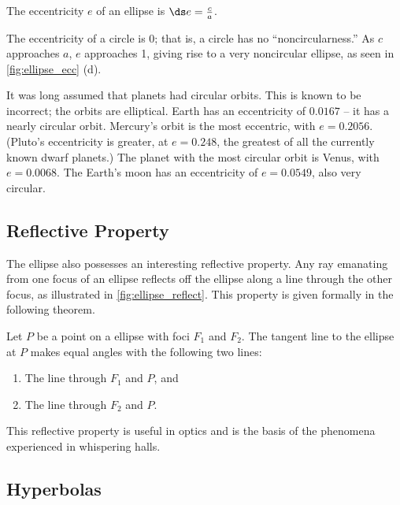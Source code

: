 {The eccentricity $e$ of an ellipse  is $\ds e=\frac{c}{a}$.
}

The eccentricity of a circle is 0; that is, a circle has no ``noncircularness.'' As $c$ approaches $a$, $e$ approaches 1, giving rise to a very noncircular ellipse, as seen in \autoref{fig:ellipse_ecc} (d). 

It was long assumed that planets had circular orbits. This is known to be incorrect; the orbits are elliptical. Earth has an eccentricity of $0.0167$ -- it has a nearly circular orbit.   Mercury's orbit is the most eccentric, with $e=0.2056$. (Pluto's eccentricity is greater, at $e=0.248$, the greatest of all the currently known dwarf planets.) The planet with the most circular orbit is Venus, with $e=0.0068$. The Earth's moon has an eccentricity of $e=0.0549$, also very circular.

\subsection*{Reflective Property}

The ellipse also possesses an interesting reflective property. Any ray emanating from one focus of an ellipse reflects off the ellipse along a line through the other focus, as illustrated in \autoref{fig:ellipse_reflect}. This property is given formally in the following theorem.


{Let $P$ be a point on a ellipse with foci $F_1$ and $F_2$. The tangent line to the ellipse at $P$ makes equal angles with the following two lines:
\begin{enumerate}
	\item The line through $F_1$ and $P$, and
	\item	The line through $F_2$ and $P$. 
\end{enumerate}}

This reflective property is useful in optics and is the basis of the phenomena experienced in whispering halls.

\subsection*{Hyperbolas}

